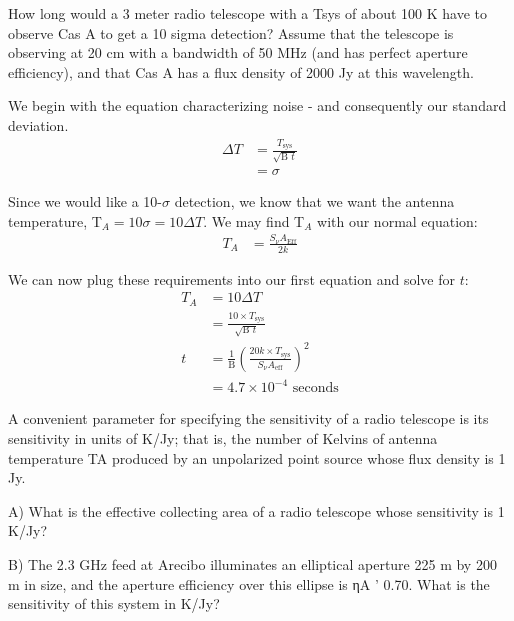 \documentclass[12pt]{article}
\newenvironment{answer}[2][Answer]{\begin{trivlist}
\item[\hskip \labelsep {\bfseries #1}\hskip \labelsep {\bfseries #2.}]}{\end{trivlist}}
\newenvironment{warmup}[2][Warm Up]{\begin{trivlist}
\item[\hskip \labelsep {\bfseries #1}\hskip \labelsep {\bfseries #2.}]}{\end{trivlist}}
\begin{document}
\begin{warmup}{3}
  How long would a 3 meter radio telescope with a Tsys of about 100 K have to observe Cas A to get a 10 sigma detection? Assume that the telescope is observing at 20 cm with a bandwidth of 50 MHz (and has perfect aperture efficiency), and that Cas A has a flux density of 2000 Jy at this wavelength.
\end{warmup}
\begin{answer}{Warm Up 3}

We begin with the equation characterizing noise - and consequently our standard deviation.
\begin{align*}
  \Delta T &= \frac{T_{\text{sys}}}{\sqrt{\text{B } t}} \\
           &= \sigma
\end{align*}

Since we would like a 10-$\sigma$ detection, we know that we want the antenna temperature, T$_A = 10 \sigma = 10 \Delta T$. We may find T$_A$ with our normal equation:
\begin{align*}
  T_A &= \frac{S_{\nu} A_{\text{Eff}}}{2k}
\end{align*}

We can now plug these requirements into our first equation and solve for $t$:
\begin{align*}
  T_A &= 10 \Delta T \\
      &= \frac{10 \times T_{\text{sys}}}{\sqrt{\text{B } t}} \\
  t &= \frac{1}{\text{B}} \left( \frac{20 k \times T_{\text{sys}}}{S_{\nu} A_{\text{eff}}} \right)^2 \\
    &= 4.7 \times 10^{-4} \text{ seconds}
\end{align*}

\end{answer}


\bigskip
\bigskip

\begin{warmup}{4}
  A convenient parameter for specifying the sensitivity of a radio telescope is its sensitivity in units of K/Jy; that is, the number of Kelvins of antenna temperature TA produced by an unpolarized point source whose flux density is 1 Jy.

  A) What is the effective collecting area of a radio telescope whose sensitivity is 1 K/Jy?

  B) The 2.3 GHz feed at Arecibo illuminates an elliptical aperture 225 m by 200 m in size, and the aperture efficiency over this ellipse is ηA ' 0.70. What is the sensitivity of this system in K/Jy?
\end{warmup}
\end{document}
